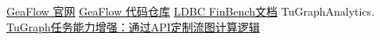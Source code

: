 \begin{thebibliography}{99}
 \href{https://tugraph-analytics.readthedocs.io/en/latest/}{GeaFlow 官网}
 \href{https://github.com/TuGraph-family/tugraph-analytics}{GeaFlow 代码仓库}
 \href{https://arxiv.org/pdf/2306.15975.pdf}{LDBC FinBench⽂档}
 TuGraphAnalytics. \href{https://zhuanlan.zhihu.com/p/650101776}{TuGraph任务能⼒增强：通过API定制流图计算逻辑}
\end{thebibliography}
